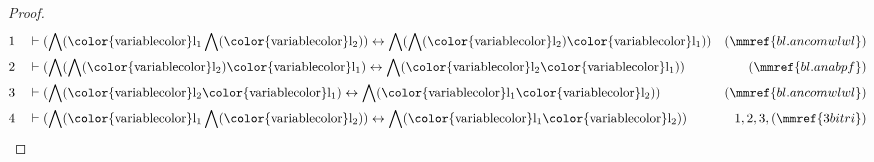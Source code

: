 \begin{proof}
\begin{align}
  1 && & \vdash ( \bigwedge( {\rm\color{variablecolor}l_1} \bigwedge(
      {\rm\color{variablecolor}l_2} ) ) \leftrightarrow
      \bigwedge( \bigwedge( {\rm\color{variablecolor}l_2} )
      {\rm\color{variablecolor}l_1} )
      )&(\mmref{bl.ancomwlwl})\notag
  \\ 2 && & \vdash ( \bigwedge( \bigwedge( {\rm\color{variablecolor}l_2} )
      {\rm\color{variablecolor}l_1} ) \leftrightarrow
      \bigwedge( {\rm\color{variablecolor}l_2}
      {\rm\color{variablecolor}l_1} )
      )&(\mmref{bl.anabpf})\notag
  \\ 3 && & \vdash ( \bigwedge( {\rm\color{variablecolor}l_2}
      {\rm\color{variablecolor}l_1} ) \leftrightarrow
      \bigwedge( {\rm\color{variablecolor}l_1}
      {\rm\color{variablecolor}l_2} )
      )&(\mmref{bl.ancomwlwl})\notag
  \\ 4 && & \vdash ( \bigwedge( {\rm\color{variablecolor}l_1} \bigwedge(
      {\rm\color{variablecolor}l_2} ) ) \leftrightarrow
      \bigwedge( {\rm\color{variablecolor}l_1}
      {\rm\color{variablecolor}l_2} )
      )&1,2,3,(\mmref{3bitri})\notag
\end{align}
\end{proof}

